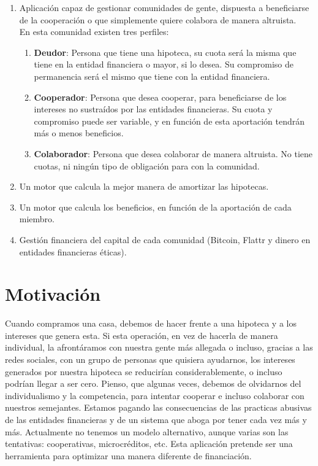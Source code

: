 \documentclass[10pt]{article}
\begin{document}
\begin{enumerate}
  \item Aplicación capaz de gestionar comunidades de gente, dispuesta a beneficiarse de la cooperación o que simplemente quiere colabora de manera altruista.\\ 
En esta comunidad existen tres perfiles:
\begin{enumerate}
\item \textbf{Deudor}: Persona que tiene una hipoteca, su cuota será la misma que tiene en la entidad financiera o mayor, si lo desea. Su compromiso de permanencia será el mismo que tiene con la entidad financiera.
\item \textbf{Cooperador}: Persona que desea cooperar, para beneficiarse de los intereses no sustraídos por las entidades financieras. Su cuota y compromiso puede ser variable, y en función de esta aportación tendrán más o menos beneficios.
\item \textbf{Colaborador}: Persona que desea colaborar de manera altruista. No tiene cuotas, ni ningún tipo de obligación para con la comunidad.
\end{enumerate}
  \item Un motor que calcula la mejor manera de amortizar las hipotecas.
  \item Un motor que calcula los beneficios, en función de la aportación de cada miembro.
  \item Gestión financiera del capital de cada comunidad (Bitcoin, Flattr y dinero en entidades financieras éticas).
\end{enumerate}


\section{Motivación}

Cuando compramos una casa, debemos de hacer frente a una hipoteca y a los intereses que genera esta. Si esta operación, en vez de hacerla de manera individual, la afrontáramos con nuestra gente más allegada o incluso, gracias a las redes sociales, con un grupo de personas que quisiera ayudarnos, los intereses generados por nuestra hipoteca se reducirían considerablemente, o incluso podrían llegar a ser cero. Pienso, que algunas veces, debemos de olvidarnos del individualismo y la competencia, para intentar cooperar e incluso colaborar con nuestros semejantes. Estamos pagando las consecuencias de las practicas abusivas de las entidades financieras y de un sistema que aboga por tener cada vez más y más. Actualmente no tenemos un modelo alternativo, aunque varias son las tentativas: cooperativas, microcréditos, etc. Esta aplicación pretende ser una herramienta para optimizar una manera diferente de financiación.
\end{document}
